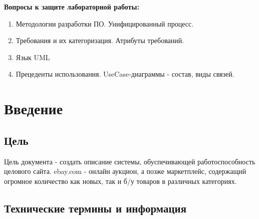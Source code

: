 \documentclass{article}
\begin{document}
\textbf{Вопросы к защите лабораторной работы:}
\begin{enumerate}
    \item Методологии разработки ПО. Унифицированный процесс.
    \item Требования и их категоризация. Атрибуты требований.
    \item Язык UML
    \item Прецеденты использования. UseCase-диаграммы - состав, виды связей.
\end{enumerate}


\section{Введение}

\subsection{Цель}

Цель документа - создать описание системы, обуспечивающей работоспособность целового сайта. ebay.com - онлайн аукцион, а позже маркетплейс, содержащий огромное количество как новых, так и б/у товаров в различных категориях. 

\subsection{Технические термины и информация}
\end{document}
